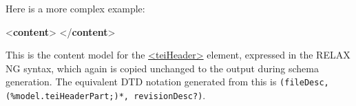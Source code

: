 Here is a more complex example: \par\bgroup{}\exampleFont \begin{shaded}\noindent\mbox{}{<\textbf{content}>}\mbox{}\newline 
{}\mbox{}\newline 
\hspace*{1em}\mbox{}\newline 
\hspace*{1em}\mbox{}\newline 
\hspace*{1em}\hspace*{1em}\mbox{}\newline 
\hspace*{1em}\mbox{}\newline 
\hspace*{1em}\mbox{}\newline 
\hspace*{1em}\hspace*{1em}\mbox{}\newline 
\hspace*{1em}\mbox{}\newline 
{}\mbox{}\newline 
{</\textbf{content}>}\end{shaded}\egroup\par \noindent  This is the content model for the \hyperref[TEI.teiHeader]{<teiHeader>} element, expressed in the RELAX NG syntax, which again is copied unchanged to the output during schema generation. The equivalent DTD notation generated from this is \texttt{(fileDesc, (\%model.teiHeaderPart;)*, revisionDesc?)}.\par
